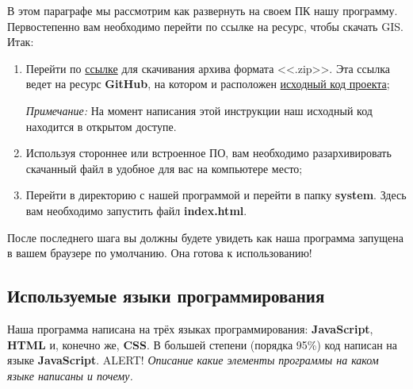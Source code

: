 %
В этом параграфе мы рассмотрим как развернуть на своем ПК нашу программу. Первостепенно вам необходимо перейти по ссылке на ресурс, чтобы скачать GIS. Итак:

\begin{enumerate}
	\item Перейти по \href{https://github.com/temikfart/GIS-Excelsior/archive/refs/heads/master.zip}{ссылке} для скачивания архива формата <<.zip>>. Эта ссылка ведет на ресурс \textbf{GitHub}, на котором и расположен \href{https://github.com/temikfart/GIS-Excelsior/tree/master}{исходный код проекта};
	
	\textit{Примечание:} На момент написания этой инструкции наш исходный код находится в открытом доступе.
	\item Используя стороннее или встроенное ПО, вам необходимо разархивировать скачанный файл в удобное для вас на компьютере место;
	\item Перейти в директорию с нашей программой и перейти в папку \textbf{system}. Здесь вам необходимо запустить файл \textbf{index.html}.
\end{enumerate}

После последнего шага вы должны будете увидеть как наша программа запущена в вашем браузере по умолчанию. Она готова к использованию!
%



\subsection{Используемые языки программирования}

%
Наша программа написана на трёх языках программирования: \textbf{JavaScript}, \textbf{HTML} и, конечно же, \textbf{CSS}. В большей степени (порядка 95\%) код написан на языке \textbf{JavaScript}. {\Large ALERT!} \textit{Описание какие элементы программы на каком языке написаны и почему.}
%
